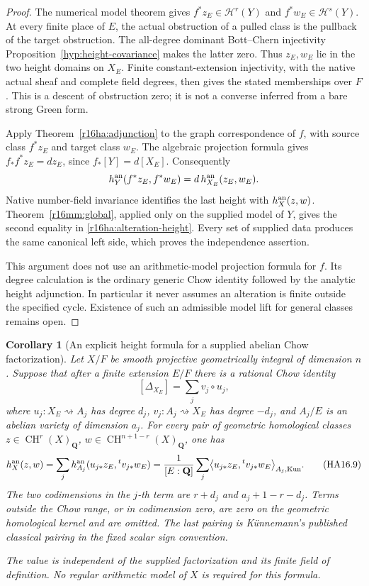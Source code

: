 \documentclass[11pt,a4paper]{article}
\newtheorem{corollary}[theorem]{Corollary}
\theoremstyle{definition}
\theoremstyle{remark}
\numberwithin{equation}{section}
\begin{document}
\begin{proof}
The numerical model theorem gives
$f^*z_E\in\mathcal H^r(Y)$ and
$f^*w_E\in\mathcal H^s(Y)$. At every finite place of $E$,
the actual obstruction of a pulled class is the pullback of the
target obstruction. The all-degree dominant Bott--Chern
injectivity Proposition~\ref{hyp:height-covariance} makes the latter zero.
Thus $z_E,w_E$ lie in the two height domains on $X_E$.
Finite constant-extension injectivity, with the native actual
sheaf and complete field degrees, then gives the stated
memberships over $F$. This is a descent of obstruction zero;
it is not a converse inferred from a bare strong Green form.

Apply Theorem~\ref{r16ha:adjunction} to the graph correspondence
of $f$, with source class $f^*z_E$ and target class $w_E$.
The algebraic projection formula gives
$f_*f^*z_E=d z_E$, since $f_*[Y]=d[X_E]$.
Consequently
\[
                 h_Y^{\rm an}(f^*z_E,f^*w_E)
                         =d\,h_{X_E}^{\rm an}(z_E,w_E).
\]
Native number-field invariance identifies the last height with
$h_X^{\rm an}(z,w)$. Theorem~\ref{r16mm:global}, applied only
on the supplied model of $Y$, gives the second equality in
\eqref{r16ha:alteration-height}. Every set of supplied data
produces the same canonical left side, which proves the
independence assertion.

This argument does not use an arithmetic-model projection
formula for $f$. Its degree calculation is the ordinary generic
Chow identity followed by the analytic height
adjunction. In particular it never assumes an alteration is
finite outside the specified cycle. Existence of such an
admissible model lift for general classes remains open.
\end{proof}

\begin{corollary}[An explicit height formula for a supplied abelian Chow factorization]
\label{r16ha:motivic-formula}
Let $X/F$ be smooth projective geometrically integral of
dimension $n$. Suppose that after a finite extension $E/F$
there is a rational Chow identity
\[
                 [\Delta_{X_E}]=\sum_j v_j\circ u_j,
 \tag{HA16.8}\label{r16ha:factorization}
\]
where $u_j:X_E\rightsquigarrow A_j$ has degree $d_j$,
$v_j:A_j\rightsquigarrow X_E$ has degree $-d_j$, and
$A_j/E$ is an abelian variety of dimension $a_j$.
For every pair of geometric homological classes
$z\in\operatorname{CH}^r(X)_{\mathbf Q}$,
$w\in\operatorname{CH}^{n+1-r}(X)_{\mathbf Q}$, one has
\[
 h_X^{\rm an}(z,w)
   =\sum_j h_{A_j}^{\rm an}
                   (u_{j*}z_E,{}^tv_{j*}w_E)
   =\frac1{[E:\mathbf Q]}\sum_j
        \bigl\langle u_{j*}z_E,{}^tv_{j*}w_E\bigr\rangle_{A_j,\mathrm{Kun}}.
 \tag{HA16.9}\label{r16ha:motivic-height}
\]
The two codimensions in the $j$-th term are
$r+d_j$ and $a_j+1-r-d_j$. Terms outside the Chow range, or
in codimension zero, are zero on the geometric homological
kernel and are omitted. The last pairing is K\"unnemann's
published classical pairing in the fixed scalar sign convention.

The value is independent of the supplied factorization and its
finite field of definition. No regular arithmetic model of
$X$ is required for this formula.
\end{corollary}
\end{document}
